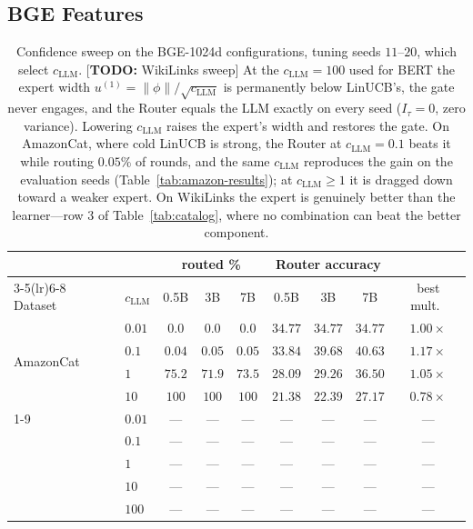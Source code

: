 \documentclass{article}
\theoremstyle{definition}
\theoremstyle{remark}
\theoremstyle{remark}
\newcommand{\todo}[1]{\textcolor{red!70!black}{[\textbf{TODO:} #1]}}
\begin{document}
\subsection{BGE Features}
\label{app:bge}

\begin{table}[h]
\centering
\caption{Confidence sweep on the BGE-1024d configurations, tuning seeds
$11$--$20$, which select $c_{\mathrm{LLM}}$. \todo{WikiLinks sweep} At the
$c_{\mathrm{LLM}}=100$ used for BERT the expert width $u^{(1)}=\|\phi\|/\sqrt{c_{\mathrm{LLM}}}$ is
permanently below LinUCB's, the gate never engages, and the Router equals the
LLM exactly on every seed ($I_\tau=0$, zero variance). Lowering $c_{\mathrm{LLM}}$ raises the
expert's width and restores the gate. On AmazonCat, where cold LinUCB is
strong, the Router at $c_{\mathrm{LLM}}=0.1$ beats it while routing $0.05\%$ of rounds, and
the same $c_{\mathrm{LLM}}$ reproduces the gain on the evaluation seeds
(Table~\ref{tab:amazon-results}); at $c_{\mathrm{LLM}}\ge1$ it is dragged down toward a
weaker expert. On WikiLinks the expert is
genuinely better than the learner---row 3 of Table~\ref{tab:catalog}, where no
combination can beat the better component.}
\label{tab:bge-csweep}
\scriptsize
\setlength{\tabcolsep}{4pt}
\begin{tabular}{@{}llccccccc@{}}
\toprule
& & \multicolumn{3}{c}{routed \%} & \multicolumn{3}{c}{Router accuracy} & \\
\cmidrule(lr){3-5}\cmidrule(lr){6-8}
Dataset & $c_{\mathrm{LLM}}$ & 0.5B & 3B & 7B & 0.5B & 3B & 7B & best mult.\ \\
\midrule
\multirow{4}{*}{AmazonCat} & $0.01$ & $0.0$ & $0.0$ & $0.0$ & $34.77$ & $34.77$ & $34.77$ & $1.00\times$ \\
 & $\mathbf{0.1}$ & $0.04$ & $0.05$ & $0.05$ & $33.84$ & $39.68$ & $\mathbf{40.63}$ & $\mathbf{1.17\times}$ \\
 & $1$  & $75.2$ & $71.9$ & $73.5$ & $28.09$ & $29.26$ & $36.50$ & $1.05\times$ \\
 & $10$ & $100$ & $100$ & $100$ & $21.38$ & $22.39$ & $27.17$ & $0.78\times$ \\
\cmidrule(lr){1-9}
\multirow{5}{*}{WikiLinks} & $0.01$ & --- & --- & --- & --- & --- & --- & --- \\
 & $0.1$ & --- & --- & --- & --- & --- & --- & --- \\
 & $1$  & --- & --- & --- & --- & --- & --- & --- \\
 & $10$ & --- & --- & --- & --- & --- & --- & --- \\
 & $100$ & --- & --- & --- & --- & --- & --- & --- \\
\bottomrule
\end{tabular}
\end{table}
\end{document}
